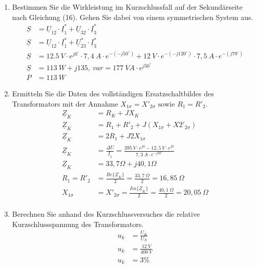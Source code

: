 \begin{enumerate}[label=\alph*)]
	\item Bestimmen Sie die Wirkleistung im Kurzschlussfall auf der Sekundärseite nach
	      Gleichung (16). Gehen Sie dabei von einem symmetrischen System aus.
	      \begin{align*}
		      \underline S & = \underline U_{12} \cdot \underline I_1^* + \underline U_{32}\cdot \underline I_3^*   \\
		      \underline S & = \underline U_{12} \cdot \underline I_1^* + \underline U_{23}^*\cdot \underline I_3^* \\
		      \underline S & = 12.5\ V \cdot e^{j0^\circ} \cdot 7,4\ A \cdot e^{-(-j50^\circ)}
		      + 12\ V \cdot e^{-(-j120^\circ)}\cdot 7,5\ A \cdot e^{-(j70^\circ)}                                   \\
		      \underline S & = 113\ W+j 135,\ var = 177\ VA \cdot e^{j50^\circ}                                     \\
		      P            & = 113\ W
	      \end{align*}

	\item Ermitteln Sie die Daten des vollständigen Ersatzschaltbildes des Transformators
	      mit der Annahme $X_{1\sigma} = X'_{2\sigma} \text{ sowie } R_1 = R'_2$.
	      \begin{align*}
		      \underline Z_K & = R_K + JX_{K}                                                                                 \\
		      \underline Z_K & = R_1 + R'_2 + J(X_{1\sigma} + X2'_{2\sigma})                                                  \\
		      \underline Z_K & = 2R_1 + J2X_{1\sigma}                                                                         \\
		      \underline Z_K & = \frac{\underline \Delta U}{\underline I_1} = \frac{395\ V\cdot e^{j0} - 12,5\ V\cdot e^{j0}}
		      {7,3\ A \cdot e^{-j50^\circ}}                                                                                   \\
		      \underline Z_K & = 33,7 \Omega + j40,1 \Omega                                                                   \\
		      R_1 = R'_2     & = \frac {Re\{\underline Z_K\}}{2} = \frac{33,7\ \Omega}{2} = 16,85\ \Omega                     \\
		      X_{1\sigma}    & = X'_{2\sigma} = \frac {Im\{\underline Z_K\}}{2} = \frac{40,1\ \Omega}{2} = 20,05\ \Omega      \\
	      \end{align*}

	\item Berechnen Sie anhand des Kurzschlussversuches die relative Kurzschlussspannung
	      des Transformators.
	      \begin{align*}
		      u_k & = \frac{U_K}{U_N}      \\
		      u_k & = \frac{12\ V}{400\ V} \\
		      u_k & = 3\%
	      \end{align*}

\end{enumerate}
